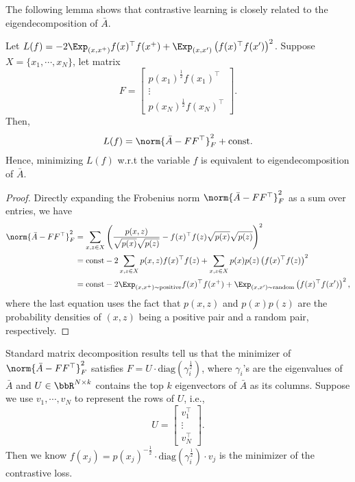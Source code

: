 The following lemma shows that contrastive learning is closely related to the eigendecomposition of $\bar{A}$. 
\begin{lemma}\label{lemma:scl_as_decomposition}
	Let $L(f) = -2\Exp_{(x, x^+) } f(x)^\top f(x^+) + \Exp_{(x, x') } \left(f(x)^\top f(x')\right)^2$.  Suppose $X=\{x_1, \cdots, x_N\}$, let matrix 
	\begin{equation}
	    F = \begin{bmatrix}  p(x_1)^{\frac{1}{2}} f(x_1)^\top  \\ \vdots \\  p(x_N)^{\frac{1}{2}} f(x_N)^\top \end{bmatrix}.
	\end{equation}
	Then,
	\begin{align}
		L(f) = \norm{\bar{A}-FF^\top}_F^2 +\text{const}.
	\end{align}
	Hence, minimizing $L(f)$ w.r.t the variable $f$ is equivalent to eigendecomposition of $\bar{A}$. 
\end{lemma}
\begin{proof}
Directly expanding the Frobenius norm $\norm{\bar{A}-FF^\top}_F^2$ as a sum over entries, we have
\begin{align}
	\norm{\bar{A} - FF^\top}_F^2 &= \sum_{x, z\in X} \left(\frac{p(x, z)}{\sqrt{p(x)}\sqrt{p(z)}} - f(x)^\top f(z) \sqrt{p(x)}\sqrt{p(z)}\right)^2\\
	&= \text{const} -2 \sum_{x, z\in X} p(x, z) f(x)^\top f(z) + \sum_{x, z\in X}p(x)p(z)\left(f(x)^\top f(z)\right)^2\\
	&= \text{const} -2\Exp_{(x, x^+) \sim\text{positive}} f(x)^\top f(x^+) + \Exp_{(x, x') \sim\text{random}}  \left(f(x)^\top f(x')\right)^2,
\end{align}
where the last equation uses the fact that $p(x, z)$ and $p(x)p(z)$ are the probability densities of $(x,z)$ being a positive pair and a random pair, respectively. 
\end{proof}

Standard matrix decomposition results tell us that the minimizer of $\norm{\bar{A}-FF^\top}_F^2 $ satisfies $F = U \cdot \text{diag}(\gamma_i^{\frac{1}{2}})$, where $\gamma_i$'s are the eigenvalues of $\bar{A}$ and $U\in\bbR^{N\times k}$ contains the top $k$ eigenvectors of $\bar{A}$ as its columns. Suppose we use $v_1, \cdots, v_N$ to represent the rows of $U$, i.e., 
	\begin{equation}
	U = \begin{bmatrix}  v_1^\top  \\ \vdots \\  v_N^\top \end{bmatrix}.
\end{equation}
Then we know $f(x_j)= p(x_j)^{-\frac{1}{2}} \cdot \text{diag}(\gamma_i^{\frac{1}{2}}) \cdot v_j$ is the minimizer of the contrastive loss. 

